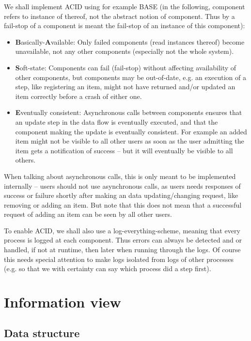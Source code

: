 We shall implement ACID using for example BASE (in the following, component refers to instance of thereof, not the abstract notion of component. Thus by a fail-stop of a component is meant the fail-stop of an instance of this component):
\begin{itemize}
    \item \textbf{B}asically-\textbf{A}vailable: Only failed components (read instances thereof) become unavailable, not any other components (especially not the whole system).
    \item \textbf{S}oft-state: Components can fail (fail-stop) without affecting availability of other components, but components may be out-of-date, e.g. an execution of a step, like registering an item, might not have returned and/or updated an item correctly before a crash of either one.
    \item \textbf{E}ventually consistent: Asynchronous calls between components ensures that an update step in the data flow is eventually executed, and that the component making the update is eventually consistent. For example an added item might not be visible to all other users as soon as the user admitting the item gets a notification of success -- but it will eventually be visible to all others.
\end{itemize}
When talking about asynchronous calls, this is only meant to be implemented internally -- users should not use asynchronous calls, as users needs responses of success or failure shortly after making an data updating/changing request, like removing or adding an item. But note that this does not mean that a successful request of adding an item can be seen by all other users.

To enable ACID, we shall also use a log-everything-scheme, meaning that every process is logged at each component. Thus errors can always be detected and or handled, if not at runtime, then later when running through the logs. Of course this needs special attention to make logs isolated from logs of other processes (e.g. so that we with certainty can say which process did a step first).


\section{Information view}
\label{cha:information-view}


\subsection{Data structure}
\label{sec:data-structure}


